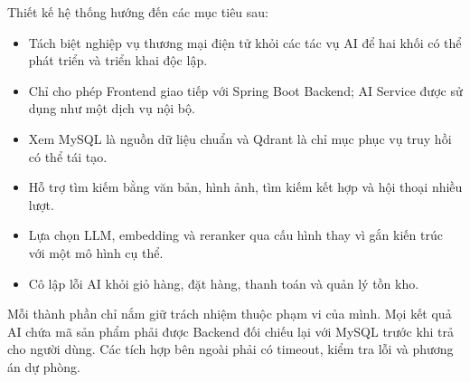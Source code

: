Thiết kế hệ thống hướng đến các mục tiêu sau:

\begin{itemize}
    \item Tách biệt nghiệp vụ thương mại điện tử khỏi các tác vụ AI để hai khối có thể phát triển và triển khai độc lập.
    \item Chỉ cho phép Frontend giao tiếp với Spring Boot Backend; AI Service được sử dụng như một dịch vụ nội bộ.
    \item Xem MySQL là nguồn dữ liệu chuẩn và Qdrant là chỉ mục phục vụ truy hồi có thể tái tạo.
    \item Hỗ trợ tìm kiếm bằng văn bản, hình ảnh, tìm kiếm kết hợp và hội thoại nhiều lượt.
    \item Lựa chọn LLM, embedding và reranker qua cấu hình thay vì gắn kiến trúc với một mô hình cụ thể.
    \item Cô lập lỗi AI khỏi giỏ hàng, đặt hàng, thanh toán và quản lý tồn kho.
\end{itemize}

Mỗi thành phần chỉ nắm giữ trách nhiệm thuộc phạm vi của mình. Mọi kết quả AI chứa mã sản phẩm phải được Backend đối chiếu lại với MySQL trước khi trả cho người dùng. Các tích hợp bên ngoài phải có timeout, kiểm tra lỗi và phương án dự phòng.



